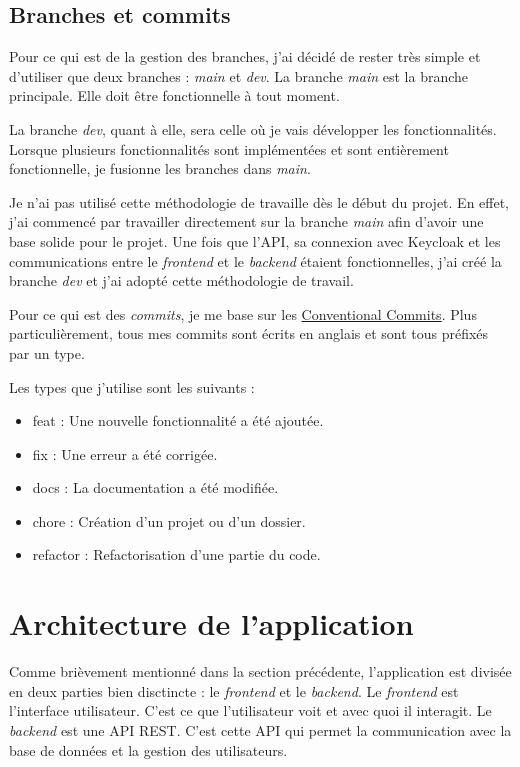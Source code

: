 \subsection{Branches et commits}
Pour ce qui est de la gestion des branches, j'ai décidé de rester très simple et d'utiliser que deux branches : \emph{main} et \emph{dev}. La branche \emph{main} est la branche principale. Elle doit être fonctionnelle à tout moment.

La branche \emph{dev}, quant à elle, sera celle où je vais développer les fonctionnalités. Lorsque plusieurs fonctionnalités sont implémentées et sont entièrement fonctionnelle, je fusionne les branches dans \emph{main}.

Je n'ai pas utilisé cette méthodologie de travaille dès le début du projet. En effet, j'ai commencé par travailler directement sur la branche \emph{main} afin d'avoir une base solide pour le projet. Une fois que l'API, sa connexion avec Keycloak et les communications entre le \emph{frontend} et le \emph{backend} étaient fonctionnelles, j'ai créé la branche \emph{dev} et j'ai adopté cette méthodologie de travail.

Pour ce qui est des \emph{commits}, je me base sur les \href{https://www.conventionalcommits.org/en/v1.0.0/}{Conventional Commits}. Plus particulièrement, tous mes commits sont écrits en anglais et sont tous préfixés par un type.

Les types que j'utilise sont les suivants :
\begin{itemize}
    \item feat : Une nouvelle fonctionnalité a été ajoutée.
    \item fix : Une erreur a été corrigée.
    \item docs : La documentation a été modifiée.
    \item chore : Création d'un projet ou d'un dossier.
    \item refactor : Refactorisation d'une partie du code.
\end{itemize}

\section{Architecture de l'application}
Comme brièvement mentionné dans la section précédente, l'application est divisée en deux parties bien disctincte : le \emph{frontend} et le \emph{backend}. Le \emph{frontend} est l'interface utilisateur. C'est ce que l'utilisateur voit et avec quoi il interagit. Le \emph{backend} est une API REST. C'est cette API qui permet la communication avec la base de données et la gestion des utilisateurs.

